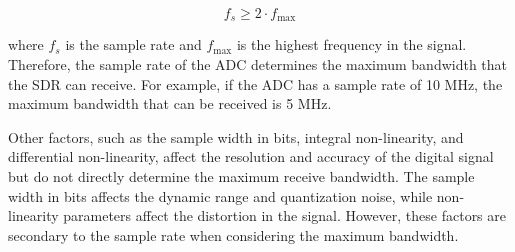 \[
f_s \geq 2 \cdot f_{\text{max}}
\]

where \( f_s \) is the sample rate and \( f_{\text{max}} \) is the highest frequency in the signal. Therefore, the sample rate of the ADC determines the maximum bandwidth that the SDR can receive. For example, if the ADC has a sample rate of 10 MHz, the maximum bandwidth that can be received is 5 MHz.

Other factors, such as the sample width in bits, integral non-linearity, and differential non-linearity, affect the resolution and accuracy of the digital signal but do not directly determine the maximum receive bandwidth. The sample width in bits affects the dynamic range and quantization noise, while non-linearity parameters affect the distortion in the signal. However, these factors are secondary to the sample rate when considering the maximum bandwidth.


